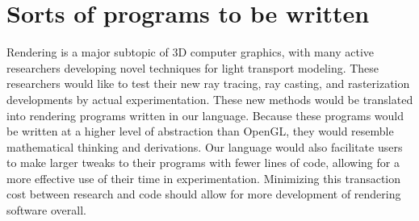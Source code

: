 \documentclass[11pt]{article}
\begin{document}
\section{Sorts of programs to be written}
    Rendering is a major subtopic of 3D computer graphics, with many active 
    researchers developing novel techniques for light transport modeling. These 
    researchers would like to test their new ray tracing, ray casting, and 
    rasterization developments by actual experimentation. These new methods would be 
    translated into rendering programs written in our language. Because these 
    programs would be written at a higher level of abstraction than OpenGL, they 
    would resemble mathematical thinking and derivations. Our language would also 
    facilitate users to make larger tweaks to their programs with fewer lines of 
    code, allowing for a more effective use of their time in experimentation. 
    Minimizing this transaction cost between research and code should allow for more 
    development of rendering software overall.

\iffalse
\section{Parts of the language and what they do}
    \begin{itemize}
        \item Data types: Integers (int), floating point numbers (float), single and multidimensional arrays, matrices (up to 4x4) (matrix), strings (string) -- for file I/O and writing
        \item  Built-in cos, sin, exp, and log functions
        \item  Loops (for and while), if and else statements
        \item  User-defined functions
        \item  Comments
        \item  Buffer/Image opaque types for data on the GPU
            \begin{itemize}
            \item Represent data stored on the GPU
            \item Only way to interact is through uploading/downloading to arrays
            \end{itemize}
        \item Shaders
            \begin{itemize}
            \item Functions annotated for use on the GPU
            \item Arguments represent resources 
            \end{itemize}
        \item Pipeline built-in type for actual rendering
            \begin{itemize}
                \item  Can “bind” shaders, buffers and images to the pipeline for use as inputs/outputs
            \end{itemize}
    \end{itemize}
\fi
\end{document}
